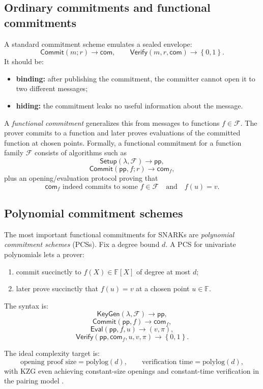\documentclass[11pt]{article}
\newcommand{\F}{\mathbb{F}}
\newcommand{\pp}{\mathsf{pp}}
\newcommand{\Commit}{\mathsf{Commit}}
\newcommand{\Verify}{\mathsf{Verify}}
\newcommand{\Setup}{\mathsf{Setup}}
\newcommand{\set}[1]{\left\{#1\right\}}
\begin{document}
\subsection{Ordinary commitments and functional commitments}

A standard commitment scheme emulates a sealed envelope:
\[
\Commit(m;r)\to \mathsf{com},\qquad \Verify(m,r,\mathsf{com})\to\set{0,1}.
\]
It should be:
\begin{itemize}[leftmargin=2em]
    \item \textbf{binding:} after publishing the commitment, the committer cannot open it to two different messages;
    \item \textbf{hiding:} the commitment leaks no useful information about the message.
\end{itemize}

A \emph{functional commitment} generalizes this from messages to functions $f\in \mathcal{F}$. The prover commits to a function and later proves evaluations of the committed function at chosen points. Formally, a functional commitment for a function family $\mathcal{F}$ consists of algorithms such as
\[
\Setup(\lambda,\mathcal{F})\to \pp,
\]
\[
\Commit(\pp,f;r)\to \mathsf{com}_f,
\]
plus an opening/evaluation protocol proving that
\[
\mathsf{com}_f \text{ indeed commits to some } f\in \mathcal{F}
\quad\text{and}\quad
f(u)=v.
\]

\subsection{Polynomial commitment schemes}

The most important functional commitments for SNARKs are \emph{polynomial commitment schemes} (PCSs). Fix a degree bound $d$. A PCS for univariate polynomials lets a prover:
\begin{enumerate}[leftmargin=2em]
    \item commit succinctly to $f(X)\in \F[X]$ of degree at most $d$;
    \item later prove succinctly that $f(u)=v$ at a chosen point $u\in\F$.
\end{enumerate}

The syntax is:
\[
\mathsf{KeyGen}(\lambda,\mathcal{F})\to \pp,
\]
\[
\mathsf{Commit}(\pp,f)\to \mathsf{com}_f,
\]
\[
\mathsf{Eval}(\pp,f,u)\to (v,\pi),
\]
\[
\mathsf{Verify}(\pp,\mathsf{com}_f,u,v,\pi)\to\set{0,1}.
\]

The ideal complexity target is:
\[
\text{opening proof size}=\mathrm{polylog}(d),
\qquad
\text{verification time}=\mathrm{polylog}(d),
\]
with KZG even achieving constant-size openings and constant-time verification in the pairing model \cite{KateZaveruchaGoldberg2010}.
\end{document}
